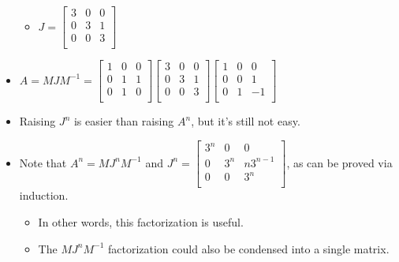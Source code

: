 \documentclass{article}
\begin{document}
\begin{itemize}
    \begin{itemize}
        \item $
            J=
            \begin{bmatrix}
                3 & 0 & 0\\
                0 & 3 & 1\\
                0 & 0 & 3\\
            \end{bmatrix}
        $
    \end{itemize}
    \item $
        A=MJM^{-1}=
        \begin{bmatrix}
            1 & 0 & 0\\
            0 & 1 & 1\\
            0 & 1 & 0\\
        \end{bmatrix}
        \begin{bmatrix}
            3 & 0 & 0\\
            0 & 3 & 1\\
            0 & 0 & 3\\
        \end{bmatrix}
        \begin{bmatrix}
            1 & 0 & 0\\
            0 & 0 & 1\\
            0 & 1 & -1\\
        \end{bmatrix}
    $
    \item Raising $J^n$ is easier than raising $A^n$, but it's still not easy.
    \item Note that $A^n=MJ^nM^{-1}$ and $
        J^n =
        \begin{bmatrix}
            3^n & 0 & 0\\
            0 & 3^n & n3^{n-1}\\
            0 & 0 & 3^n\\
        \end{bmatrix}
    $, as can be proved via induction.
    \begin{itemize}
        \item In other words, this factorization is useful.
        \item The $MJ^nM^{-1}$ factorization could also be condensed into a single matrix.
    \end{itemize}
\end{itemize}
\end{document}
